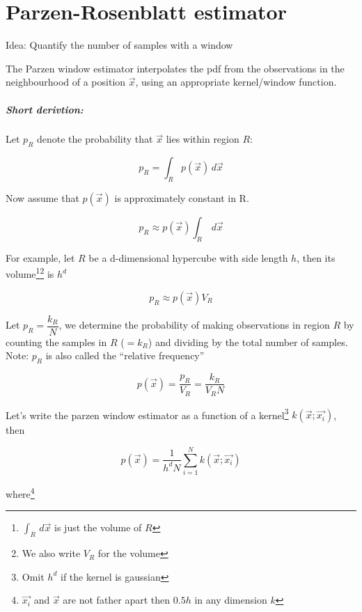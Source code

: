 
\section*{Parzen-Rosenblatt estimator}
Idea: Quantify the number of samples with a window

The Parzen window estimator interpolates the pdf from the observations in the neighbourhood of a position $\vec{x}$, using an appropriate kernel/window function.

\subparagraph{Short derivtion:}
Let $p_R$ denote the probability that $\vec{x}$ lies within region $R$:

\begin{equation*}
  p_R = \int_R p(\vec{x}) \,d\vec{x}
\end{equation*}

Now assume that $p(\vec{x})$ is approximately constant in R.

\begin{equation*}
  p_R \approx p(\vec{x}) \int_R \,d\vec{x}
\end{equation*}

For example, let $R$ be a d-dimensional hypercube with side length $h$, then its volume\footnote{$\int_R \,d\vec{x}$ is just the volume of $R$}\footnote{We also write $V_R$ for the volume} is $h^d$

\begin{equation*}
  p_R \approx p(\vec{x}) V_R
\end{equation*}

Let $p_R = \dfrac{k_R}{N}$, we determine the probability of making observations in region $R$ by counting the samples in $R$ ($=k_R$) and dividing by the total number of samples. Note: $p_R$ is also called the ``relative frequency''

\begin{equation*}
  p(\vec{x}) = \dfrac{p_R}{V_R} = \dfrac{k_R}{V_R N}
\end{equation*}

Let's write the parzen window estimator as a function of a kernel\footnote{Omit $h^d$ if the kernel is gaussian} $k(\vec{x}; \vec{x_i})$, then

\begin{equation*}
  p(\vec{x}) = \dfrac{1}{h^d N} \sum_{i=1}^N k(\vec{x}; \vec{x_i})
\end{equation*}

where\footnote{$\vec{x_i}$ and $\vec{x}$ are not father apart then $0.5 h$ in any dimension $k$}

